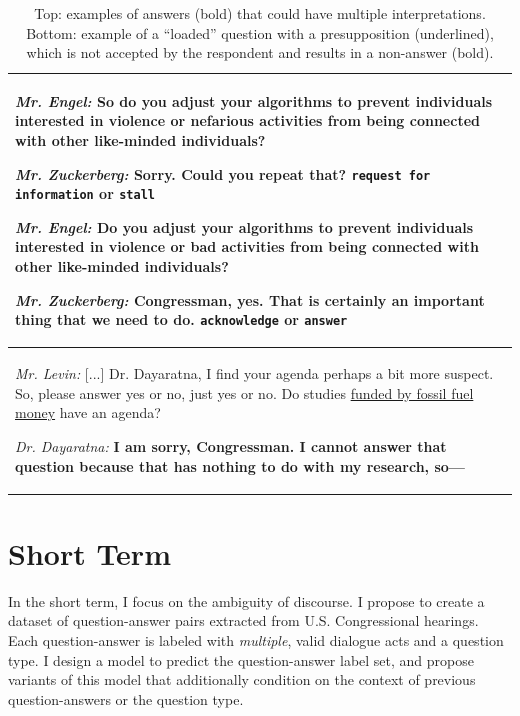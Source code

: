 \begin{table}[t]
    \centering
    \begin{tabular}{p{11cm}}
    \toprule
    \textit{Mr. Engel:} So do you adjust your algorithms to prevent individuals interested in violence or nefarious activities from being connected with other like-minded individuals?

\textit{Mr. Zuckerberg:} \textbf{Sorry. Could you repeat that?} \texttt{request for information} or \texttt{stall}

\textit{Mr. Engel:} Do you adjust your algorithms to prevent individuals interested in violence or bad activities from being connected with other like-minded individuals?

\textit{Mr. Zuckerberg:} \textbf{Congressman, yes. That is certainly an important thing that we need to do.} \texttt{acknowledge} or \texttt{answer}\\
\midrule
\textit{Mr. Levin:} [...] Dr. Dayaratna, I find your agenda perhaps a bit more suspect. So, please answer yes or no, just yes or no. Do studies \underline{funded by fossil fuel money} have an agenda?

\textit{Dr. Dayaratna:} \textbf{I am sorry, Congressman. I cannot answer that question because that has nothing to do with my research, so---}\\
    \bottomrule
    \end{tabular}
    \caption{Top: examples of answers (bold) that could have multiple interpretations. Bottom: example of a ``loaded'' question with a presupposition (underlined), which is not accepted by the respondent and results in a non-answer (bold).}
    \label{tab:example}
\end{table}

\section{Short Term}
In the short term, I focus on the ambiguity of discourse. I propose to create a dataset of question-answer pairs extracted from U.S. Congressional hearings. Each question-answer is labeled with \emph{multiple}, valid dialogue acts and a question type. I design a model to predict the question-answer label set, and propose variants of this model that additionally condition on the context of previous question-answers or the question type.

